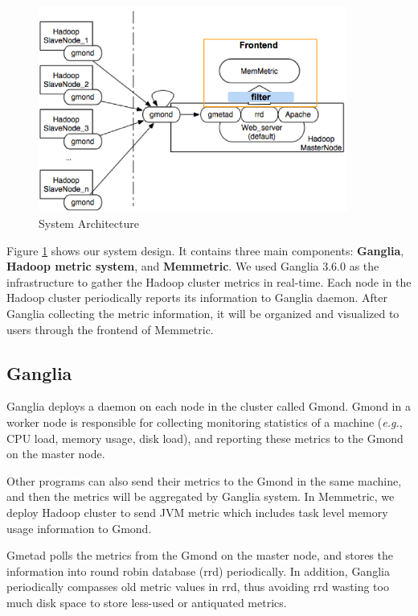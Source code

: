 \begin{figure}[ht]
  \centering
    \includegraphics[width=4.0in]{image/architecture.png}
    \caption{System Architecture}
    \label{ref:architecture}
\end{figure}

Figure \ref{ref:architecture} shows our system design. It contains three main components: \textbf{Ganglia}, \textbf{Hadoop metric system}, and \textbf{Memmetric}. We used Ganglia 3.6.0 as the infrastructure to gather the  Hadoop cluster metrics in real-time. Each node in the Hadoop cluster periodically reports its information to Ganglia daemon. After Ganglia collecting the metric information, it will be organized and visualized to users through the frontend of Memmetric.

\subsection{Ganglia}

Ganglia deploys a daemon on each node in the cluster called Gmond. Gmond in a worker node is responsible for collecting monitoring statistics of a machine (\emph{e.g.}, CPU load, memory usage, disk load), and reporting these metrics to the Gmond on the master node. 

Other programs can also send their metrics to the Gmond in the same machine, and then the metrics will be aggregated by Ganglia system. In Memmetric, we deploy Hadoop cluster to send JVM metric which includes task level memory usage information to Gmond.

Gmetad polls the metrics from the Gmond on the master node, and stores the information into round robin database (rrd) periodically. In addition, Ganglia periodically compasses old metric values in rrd, thus avoiding rrd wasting too much disk space to store less-used or antiquated metrics.

